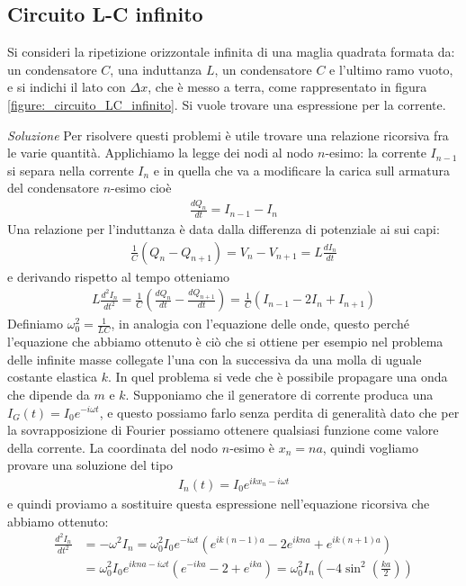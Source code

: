 \subsection{Circuito L-C infinito}
Si consideri la ripetizione orizzontale infinita di una maglia quadrata formata da: un condensatore $ C $, una induttanza $ L $, 
un condensatore $ C $ e l'ultimo ramo vuoto, e si indichi il lato con $ \Delta x $, che è messo a terra, come rappresentato in figura 
\ref{figure:_circuito_LC_infinito}. Si vuole trovare una espressione per la corrente.


\textit{Soluzione} Per risolvere questi problemi è utile trovare una relazione ricorsiva fra le varie quantità.
Applichiamo la legge dei nodi al nodo $ n $-esimo: la corrente $ I_{n-1} $ si separa nella corrente $ I_n $ e in quella che va a modificare la carica sull
armatura del condensatore $ n $-esimo cioè
\begin{align}
  \frac{dQ_n}{dt} = I_{n-1} - I_n
\end{align}
Una relazione per l'induttanza è data dalla differenza di potenziale ai sui capi:
\begin{align}
  \frac{1}{C} \left( Q_n - Q_{n+1} \right) = V_n - V_{n+1} = L \frac{dI_n}{dt}
\end{align}
e derivando rispetto al tempo otteniamo
\begin{align}
  L\frac{d^2I_n}{dt^2} = \frac{1}{C} \left( \frac{dQ_n}{dt} - \frac{dQ_{n+1}}{dt} \right) = \frac{1}{C} \left( I_{n-1} -2I_n + I_{n+1} \right)
\end{align}
Definiamo $ \omega_0^2 = \frac{1}{LC} $, in analogia con l'equazione delle onde, questo perché l'equazione che abbiamo ottenuto è ciò che si ottiene per 
esempio nel problema delle infinite masse collegate l'una con la successiva da una molla di uguale costante elastica $ k $. In quel problema si vede che è 
possibile propagare una onda che dipende da $ m $ e $ k $. Supponiamo che il generatore di corrente produca una $ I_G(t) = I_0 e^{-i\omega t} $, e questo 
possiamo farlo senza perdita di generalità dato che per la sovrapposizione di Fourier possiamo ottenere qualsiasi funzione come valore della corrente. 
La coordinata del nodo $ n $-esimo è $ x_n = na $, quindi vogliamo provare una soluzione del tipo
\begin{align}
  I_n(t) = I_0 e^{ikx_n - i\omega t}
\end{align}
e quindi proviamo a sostituire questa espressione nell'equazione ricorsiva che abbiamo ottenuto:
\begin{align}
  \frac{d^2I_n}{dt^2} &= - \omega^2 I_n = \omega_0^2 I_0 e^{-i\omega t} \left( e^{ik(n-1)a} -2e^{ikna}+ e^{ik(n+1)a}\right) 
  \\
  &= \omega_0^2 I_0 e^{ikna -i\omega t} \left( e^{-ika} -2 + e^{ika}\right) = \omega_0^2 I_n \left( -4 \sin^2\left( \frac{ka}{2} \right) \right)
\end{align}
